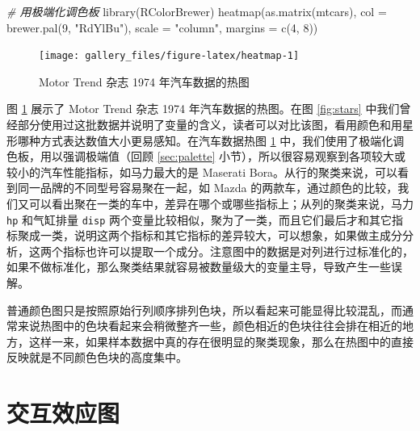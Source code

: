 \documentclass[
  b5paper,
  UTF8,twoside]{book}
\newenvironment{Shaded}{\begin{snugshade}}{\end{snugshade}}
\newcommand{\AttributeTok}[1]{\textcolor[rgb]{0.77,0.63,0.00}{#1}}
\newcommand{\CommentTok}[1]{\textcolor[rgb]{0.56,0.35,0.01}{\textit{#1}}}
\newcommand{\DecValTok}[1]{\textcolor[rgb]{0.00,0.00,0.81}{#1}}
\newcommand{\FunctionTok}[1]{\textcolor[rgb]{0.00,0.00,0.00}{#1}}
\newcommand{\NormalTok}[1]{#1}
\newcommand{\StringTok}[1]{\textcolor[rgb]{0.31,0.60,0.02}{#1}}
\begin{document}
\begin{Shaded}
\begin{Highlighting}[]
\CommentTok{\# 用极端化调色板}
\FunctionTok{library}\NormalTok{(RColorBrewer)}
\FunctionTok{heatmap}\NormalTok{(}\FunctionTok{as.matrix}\NormalTok{(mtcars), }\AttributeTok{col =} \FunctionTok{brewer.pal}\NormalTok{(}\DecValTok{9}\NormalTok{, }\StringTok{"RdYlBu"}\NormalTok{), }
        \AttributeTok{scale =} \StringTok{"column"}\NormalTok{, }\AttributeTok{margins =} \FunctionTok{c}\NormalTok{(}\DecValTok{4}\NormalTok{, }\DecValTok{8}\NormalTok{))}
\end{Highlighting}
\end{Shaded}

\begin{figure}

{\centering \texttt{[image: gallery\_files/figure-latex/heatmap-1]} 

}

\caption[汽车数据的热图]{Motor Trend 杂志 1974 年汽车数据的热图}\label{fig:heatmap}
\end{figure}

图 \ref{fig:heatmap} 展示了 Motor Trend 杂志 1974 年汽车数据的热图。在图 \ref{fig:stars} 中我们曾经部分使用过这批数据并说明了变量的含义，读者可以对比该图，看用颜色和用星形哪种方式表达数值大小更易感知。在汽车数据热图 \ref{fig:heatmap} 中，我们使用了极端化调色板，用以强调极端值（回顾 \ref{sec:palette} 小节），所以很容易观察到各项较大或较小的汽车性能指标，如马力最大的是 Maserati Bora。从行的聚类来说，可以看到同一品牌的不同型号容易聚在一起，如 Mazda 的两款车，通过颜色的比较，我们又可以看出聚在一类的车中，差异在哪个或哪些指标上；从列的聚类来说，马力 \texttt{hp} 和气缸排量 \texttt{disp} 两个变量比较相似，聚为了一类，而且它们最后才和其它指标聚成一类，说明这两个指标和其它指标的差异较大，可以想象，如果做主成分分析，这两个指标也许可以提取一个成分。注意图中的数据是对列进行过标准化的，如果不做标准化，那么聚类结果就容易被数量级大的变量主导，导致产生一些误解。

普通颜色图只是按照原始行列顺序排列色块，所以看起来可能显得比较混乱，而通常来说热图中的色块看起来会稍微整齐一些，颜色相近的色块往往会排在相近的地方，这样一来，如果样本数据中真的存在很明显的聚类现象，那么在热图中的直接反映就是不同颜色色块的高度集中。

\hypertarget{ux4ea4ux4e92ux6548ux5e94ux56fe}{%
\section{交互效应图}\label{ux4ea4ux4e92ux6548ux5e94ux56fe}}
\end{document}
